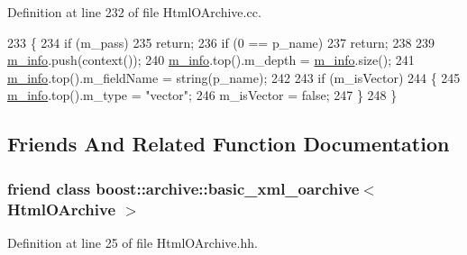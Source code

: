 Definition at line 232 of file Html\-O\-Archive.\-cc.


\begin{DoxyCode}
233 \{
234   \textcolor{keywordflow}{if} (m\_pass)
235     \textcolor{keywordflow}{return};
236   \textcolor{keywordflow}{if} (0 == p\_name)
237     \textcolor{keywordflow}{return};
238 
239   \hyperlink{classxtd_1_1servers_1_1app_1_1HtmlOArchive_a03bd854507f8457a3b5b575203108ff7}{m\_info}.push(context());
240   \hyperlink{classxtd_1_1servers_1_1app_1_1HtmlOArchive_a03bd854507f8457a3b5b575203108ff7}{m\_info}.top().m\_depth     = \hyperlink{classxtd_1_1servers_1_1app_1_1HtmlOArchive_a03bd854507f8457a3b5b575203108ff7}{m\_info}.size();
241   \hyperlink{classxtd_1_1servers_1_1app_1_1HtmlOArchive_a03bd854507f8457a3b5b575203108ff7}{m\_info}.top().m\_fieldName = string(p\_name);
242 
243   \textcolor{keywordflow}{if} (m\_isVector)
244   \{
245     \hyperlink{classxtd_1_1servers_1_1app_1_1HtmlOArchive_a03bd854507f8457a3b5b575203108ff7}{m\_info}.top().m\_type = \textcolor{stringliteral}{"vector"};
246     m\_isVector = \textcolor{keyword}{false};
247   \}
248 \}
\end{DoxyCode}


\subsection{Friends And Related Function Documentation}
\hypertarget{classxtd_1_1servers_1_1app_1_1HtmlOArchive_a350c2afaed5c679f01f1b4e36a6ad91f}{
\subsubsection[{boost\-::archive\-::basic\-\_\-xml\-\_\-oarchive$<$ Html\-O\-Archive $>$}]{\setlength{\rightskip}{0pt plus 5cm}friend class boost\-::archive\-::basic\-\_\-xml\-\_\-oarchive$<$ {\bf Html\-O\-Archive} $>$\hspace{0.3cm}{\ttfamily [friend]}}}\label{classxtd_1_1servers_1_1app_1_1HtmlOArchive_a350c2afaed5c679f01f1b4e36a6ad91f}


Definition at line 25 of file Html\-O\-Archive.\-hh.


